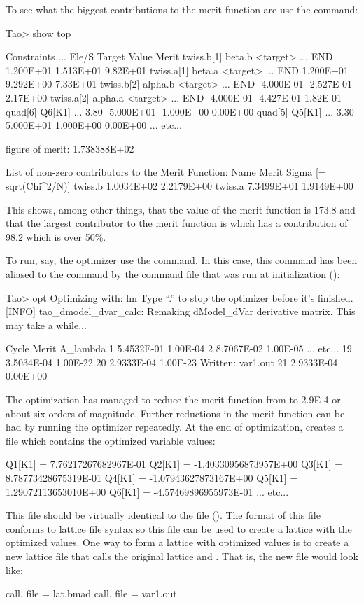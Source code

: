 \documentclass{hitec}     %
\begin{document}
{To see what the biggest contributions to the merit function
are use the  command:
\begin{code}
Tao> show top

Constraints                   ...   Ele/S     Target      Value      Merit  
twiss.b[1]  beta.b <target>   ...   END       1.200E+01   1.513E+01  9.82E+01
twiss.a[1]  beta.a <target>   ...   END       1.200E+01   9.292E+00  7.33E+01
twiss.b[2]  alpha.b <target>  ...   END      -4.000E-01  -2.527E-01  2.17E+00
twiss.a[2]  alpha.a <target>  ...   END      -4.000E-01  -4.427E-01  1.82E-01
quad[6]     Q6[K1]            ...   3.80     -5.000E+01  -1.000E+00  0.00E+00
quad[5]     Q5[K1]            ...   3.30      5.000E+01   1.000E+00  0.00E+00
... etc...

 figure of merit: 1.738388E+02

List of non-zero contributors to the Merit Function:
Name                           Merit           Sigma [= sqrt(Chi^2/N)]
twiss.b                        1.0034E+02      2.2179E+00
twiss.a                        7.3499E+01      1.9149E+00
\end{code}
This shows, among other things, that the value of the merit function is 173.8 and that the largest
contributor to the merit function is  which has a contribution of 98.2 which is over
50\%.

To run, say, the  optimizer use the  command. In this case, this command
has been aliased to the  command by the  command file that was run
at initialization ():
\begin{code}
Tao> opt
Optimizing with: lm
Type ``.'' to stop the optimizer before it's finished.
[INFO] tao_dmodel_dvar_calc:
    Remaking dModel_dVar derivative matrix.
    This may take a while...

  Cycle      Merit   A_lambda
    1    5.4532E-01  1.00E-04
    2    8.7067E-02  1.00E-05
... etc...
   19    3.5034E-04  1.00E-22
   20    2.9333E-04  1.00E-23
Written: var1.out
   21    2.9333E-04  0.00E+00
\end{code}
The optimization has managed to reduce the merit function from to 2.9E-4 or about six orders of
magnitude. Further reductions in the merit function can be had by running the optimizer
repeatedly. At the end of optimization, \tao creates a file  which contains the
optimized variable values:
\begin{code}
 Q1[K1] =   7.76217267682967E-01
 Q2[K1] =  -1.40330956873957E+00
 Q3[K1] =   8.78773428675319E-01
 Q4[K1] =  -1.07943627873167E+00
 Q5[K1] =   1.29072113653010E+00
 Q6[K1] =  -4.57469896955973E-01
... etc...
\end{code}
This file should be virtually identical to the  file (). The
format of this file conforms to \bmad lattice file syntax so this file can be used to create a
lattice with the optimized values. One way to form a lattice with optimized values is to create a
new lattice file that calls the original lattice and . That is, the new file would look
like:
\begin{code}
call, file = lat.bmad
call, file = var1.out
\end{code}

}
\end{document}
